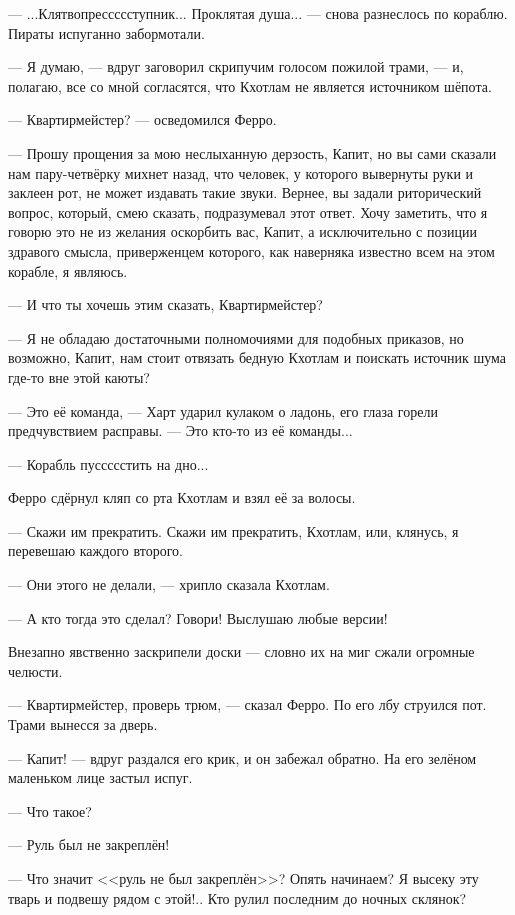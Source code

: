 --- ...Клятвопрессссступник... Проклятая душа... --- снова разнеслось по кораблю.
Пираты испуганно забормотали.

--- Я думаю, --- вдруг заговорил скрипучим голосом пожилой трами, --- и, полагаю, все со мной согласятся, что Кхотлам не является источником шёпота.

--- Квартирмейстер? --- осведомился Ферро.

--- Прошу прощения за мою неслыханную дерзость, Капит, но вы сами сказали нам пару-четвёрку михнет назад, что человек, у которого вывернуты руки и заклеен рот, не может издавать такие звуки.
Вернее, вы задали риторический вопрос, который, смею сказать, подразумевал этот ответ.
Хочу заметить, что я говорю это не из желания оскорбить вас, Капит, а исключительно с позиции здравого смысла, приверженцем которого, как наверняка известно всем на этом корабле, я являюсь.

--- И что ты хочешь этим сказать, Квартирмейстер?

--- Я не обладаю достаточными полномочиями для подобных приказов, но возможно, Капит, нам стоит отвязать бедную Кхотлам и поискать источник шума где-то вне этой каюты?

--- Это её команда, --- Харт ударил кулаком о ладонь, его глаза горели предчувствием расправы.
--- Это кто-то из её команды...

--- Корабль пуссссстить на дно...

Ферро сдёрнул кляп со рта Кхотлам и взял её за волосы.

--- Скажи им прекратить.
Скажи им прекратить, Кхотлам, или, клянусь, я перевешаю каждого второго.

--- Они этого не делали, --- хрипло сказала Кхотлам.

--- А кто тогда это сделал?
Говори!
Выслушаю любые версии!

Внезапно явственно заскрипели доски --- словно их на миг сжали огромные челюсти.

--- Квартирмейстер, проверь трюм, --- сказал Ферро.
По его лбу струился пот.
Трами вынесся за дверь.

--- Капит! --- вдруг раздался его крик, и он забежал обратно.
На его зелёном маленьком лице застыл испуг.

--- Что такое?

--- Руль был не закреплён!

--- Что значит <<руль не был закреплён>>?
Опять начинаем?
Я высеку эту тварь и подвешу рядом с этой!..
Кто рулил последним до ночных склянок?

